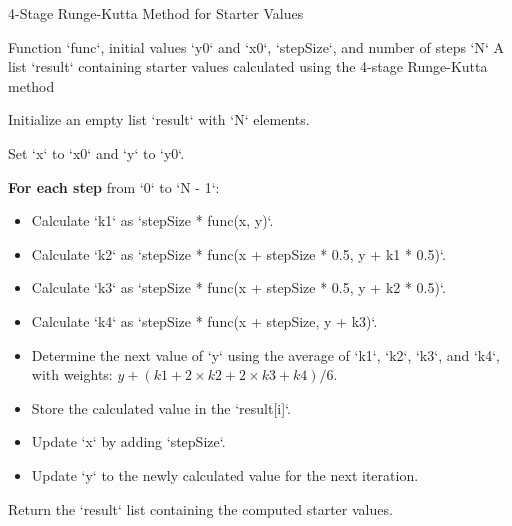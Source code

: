 \documentclass[a4paper, twoside]{report} %
\begin{document}
	\begin{algorithm}
		\caption{4-Stage Runge-Kutta Method for Starter Values}
		\label{alg:runge_kutta}
		\begin{algorithmic}[1]
			\REQUIRE Function `func`, initial values `y0` and `x0`, `stepSize`, and number of steps `N`
			\ENSURE A list `result` containing starter values calculated using the 4-stage Runge-Kutta method

			\item Initialize an empty list `result` with `N` elements.
			\item Set `x` to `x0` and `y` to `y0`.

			\item \textbf{For each step} from `0` to `N - 1`:
			\begin{itemize}
				\item Calculate `k1` as `stepSize * func(x, y)`.
				\item Calculate `k2` as `stepSize * func(x + stepSize * 0.5, y + k1 * 0.5)`.
				\item Calculate `k3` as `stepSize * func(x + stepSize * 0.5, y + k2 * 0.5)`.
				\item Calculate `k4` as `stepSize * func(x + stepSize, y + k3)`.

				\item Determine the next value of `y` using the average of `k1`, `k2`, `k3`, and `k4`, with weights: \(y + (k1 + 2 \times k2 + 2 \times k3 + k4) / 6\).

				\item Store the calculated value in the `result[i]`.

				\item Update `x` by adding `stepSize`.
				\item Update `y` to the newly calculated value for the next iteration.
			\end{itemize}

			\item Return the `result` list containing the computed starter values.
		\end{algorithmic}
	\end{algorithm}

	\newpage
\end{document}
